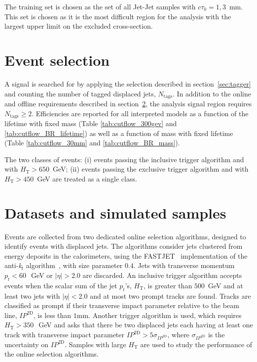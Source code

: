 The training set is chosen as the set of all Jet-Jet samples with $c\tau_0=1,3$~mm. This set is chosen as it is the
 most difficult region for the analysis with the largest upper limit on the excluded cross-section. 

\section{Event selection}


A signal is searched for by applying the selection described in
section~\ref{sec:tagger} and counting the number of tagged displaced
jets, $N_{\textrm{tags}}$.  In addition to the online and offline
requirements described in section~\ref{sec:samples}, the analysis
signal region requires $N_{\textrm{tags}} \geq 2$.  Efficiencies are
reported for all interpreted models as a function of the lifetime with
fixed mass (Table \ref{tab:cutflow_300gev} and
\ref{tab:cutflow_BR_lifetime}) as well as a function of mass with
fixed lifetime (Table \ref{tab:cutflow_30mm} and
\ref{tab:cutflow_BR_mass}).

The two classes of events: (i) events passing the inclusive trigger
algorithm and with $H_{\textrm{T}}>650$~GeV; (ii) events passing the
exclusive trigger algorithm and with $H_{\textrm{T}}>450$~GeV are
treated as a single class.  



\section{Datasets and simulated samples}
\label{sec:samples}

Events are collected from two dedicated online selection algorithms,
designed to identify events with displaced jets.  The algorithms
consider jets clustered from energy deposits in the calorimeters,
using the FASTJET~\cite{fastjet} implementation of the
anti-\textit{k}$_{\textit{t}}$ algorithm~\cite{Cacciari:2008gp}, with
size parameter $0.4$. Jets with transverse momentum $p_{t}<60~$~GeV or
$|\eta|>2.0$ are discarded.  An inclusive trigger algorithm accepts
events when the scalar sum of the jet $p_{t}$'s, $H_{\textrm{T}}$, is
greater than $500$~GeV and at least two jets with $|\eta|<2.0$ and at
most two prompt tracks are found. Tracks are classified as prompt if
their transverse impact parameter relative to the beam line,
$IP^{\textrm{2D}}$, is less than $1$mm.  Another trigger
algorithm is used, which requires $H_{\textrm{T}}>350~$~GeV and asks
that there be two displaced jets each having at least one track with
transverse impact parameter
$IP^{\textrm{2D}}>5\sigma_{IP^{\textrm{2D}}}$,
where $\sigma_{IP^{\textrm{2D}}}$ is the uncertainty on
$IP^{\textrm{2D}}$. Samples with large $H_{\textrm{T}}$ are used to
study the performance of the online selection algorithms. 

